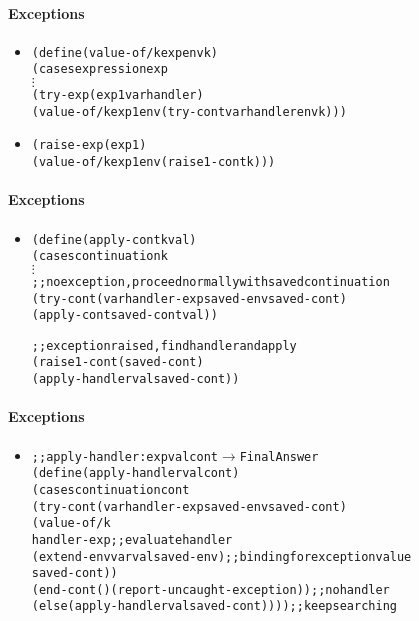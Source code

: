 \documentclass{beamer}
\newcommand{\arrow}{\(\rightarrow\)}
\newcommand{\vdotss}{\(\vdots\)}
\begin{document}
\begin{frame}[fragile]
\framesubtitle{Exceptions}
\begin{scriptsize}
\begin{itemize}
\item<1->
\begin{alltt}
(define (value-of/k exp env k)
  (cases expression exp
    \vdotss{}
    (try-exp (exp1 var handler)
      (value-of/k exp1 env (try-cont var handler env k)))
\end{alltt}

\item<2->
\begin{alltt}
    (raise-exp (exp1)
      (value-of/k exp1 env (raise1-cont k)))
\end{alltt}

\end{itemize}
\end{scriptsize}
\end{frame}

\begin{frame}[fragile]
\framesubtitle{Exceptions}
\begin{scriptsize}
\begin{itemize}
\item<1-> 
\begin{alltt}
(define (apply-cont k val)
  (cases continuation k
       \vdotss{}
    ;; no exception, proceed normally with saved continuation
    (try-cont (var handler-exp saved-env saved-cont)
      (apply-cont saved-cont val))
      
    ;; exception raised, find handler and apply
    (raise1-cont (saved-cont)
      (apply-handler val saved-cont))
\end{alltt}

\end{itemize}
\end{scriptsize}
\end{frame}

\begin{frame}[fragile]
\framesubtitle{Exceptions}
\begin{scriptsize}
\begin{itemize}
\item<1-> 
\begin{alltt}
;; apply-handler: expval cont \arrow{} Final Answer
(define (apply-handler val cont)
 (cases continuation cont
  (try-cont (var handler-exp saved-env saved-cont)
   (value-of/k 
    handler-exp ;; evaluate handler
    (extend-env var val saved-env) ;; binding for exception value
    saved-cont))
  (end-cont () (report-uncaught-exception)) ;; no handler
  (else (apply-handler val saved-cont)))) ;; keep searching
\end{alltt}

\end{itemize}
\end{scriptsize}
\end{frame}
\end{document}

